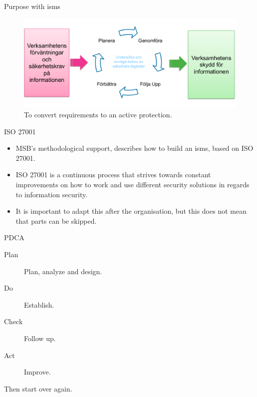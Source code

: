 \documentclass{beamer}
\begin{document}
\begin{frame}{Purpose with \ac{isms}}
  \begin{figure}
    \includegraphics[width=\textwidth]{infosak-pdca.png}
    \caption{To convert requirements to an active protection.}
  \end{figure}
\end{frame}

\begin{frame}{ISO 27001}
  \begin{itemize}
    \item MSB's methodological support, describes how to build an \ac{isms},
      based on ISO 27001.

    \item ISO 27001 is a continuous process that strives towards constant
      improvements on how to work and use different security solutions in
      regards to information security.

    \item It is important to adapt this after the organisation, but this does
      not mean that parts can be skipped.

  \end{itemize}
\end{frame}

\begin{frame}{PDCA}
  \begin{description}
    \item[Plan] Plan, analyze and design.
    \item[Do] Establish.
    \item[Check] Follow up.
    \item[Act] Improve.
  \end{description}
  Then start over again.
\end{frame}
\end{document}
